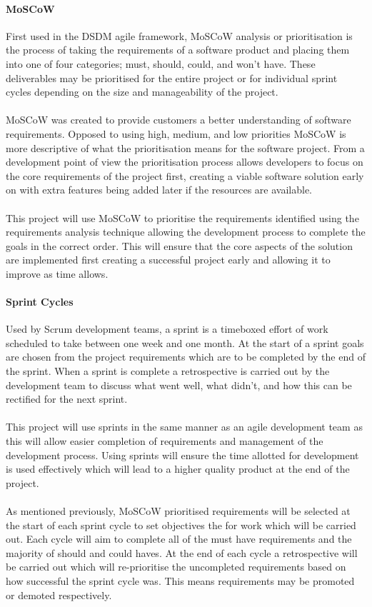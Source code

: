 		\paragraph{MoSCoW}
			First used in the DSDM agile framework, MoSCoW analysis or prioritisation is the process of taking the requirements of a software product and placing them into one of four categories; must, should, could, and won't have. These deliverables may be prioritised for the entire project or for individual sprint cycles depending on the size and manageability of the project.
			\\\\
			MoSCoW was created to provide customers a better understanding of software requirements. Opposed to using high, medium, and low priorities MoSCoW is more descriptive of what the prioritisation means for the software project. From a development point of view the prioritisation process allows developers to focus on the core requirements of the project first, creating a viable software solution early on with extra features being added later if the resources are available.
			\\\\
			This project will use MoSCoW to prioritise the requirements identified using the requirements analysis technique allowing the development process to complete the goals in the correct order. This will ensure that the core aspects of the solution are implemented first creating a successful project early and allowing it to improve as time allows.
		\paragraph{Sprint Cycles}
			Used by Scrum development teams, a sprint is a timeboxed effort of work scheduled to take between one week and one month. At the start of a sprint goals are chosen from the project requirements which are to be completed by the end of the sprint. When a sprint is complete a retrospective is carried out by the development team to discuss what went well, what didn't, and how this can be rectified for the next sprint.
			\\\\
			This project will use sprints in the same manner as an agile development team as this will allow easier completion of requirements and management of the development process. Using sprints will ensure the time allotted for development is used effectively which will lead to a higher quality product at the end of the project.
			\\\\
			As mentioned previously, MoSCoW prioritised requirements will be selected at the start of each sprint cycle to set objectives the for work which will be carried out. Each cycle will aim to complete all of the must have requirements and the majority of should and could haves. At the end of each cycle a retrospective will be carried out which will re-prioritise the uncompleted requirements based on how successful the sprint cycle was. This means requirements may be promoted or demoted respectively.
